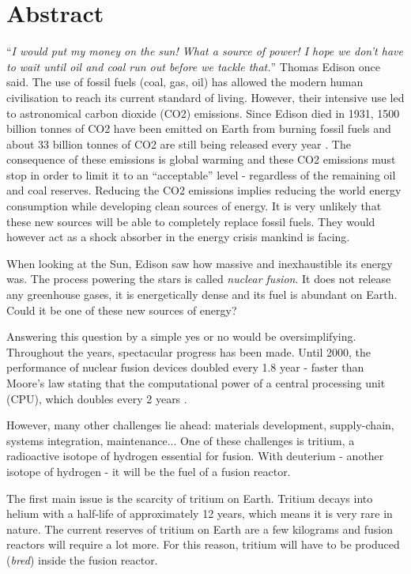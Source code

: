 \chapter*{Abstract}

``\textit{I would put my money on the sun! What a source of power! I hope we don't have to wait until oil and coal run out before we tackle that.}'' Thomas Edison once said.
The use of fossil fuels (coal, gas, oil) has allowed the modern human civilisation to reach its current standard of living.
However, their intensive use led to astronomical carbon dioxide (CO2) emissions.
Since Edison died in 1931, 1500 billion tonnes of CO2 have been emitted on Earth from burning fossil fuels and about 33 billion tonnes of CO2 are still being released every year \cite{friedlingstein_global_2021}.
The consequence of these emissions is global warming and these CO2 emissions must stop in order to limit it to an ``acceptable'' level - regardless of the remaining oil and coal reserves.
Reducing the CO2 emissions implies reducing the world energy consumption while developing clean sources of energy.
It is very unlikely that these new sources will be able to completely replace fossil fuels.
They would however act as a shock absorber in the energy crisis mankind is facing.

When looking at the Sun, Edison saw how massive and inexhaustible its energy was.
The process powering the stars is called \textit{nuclear fusion}.
It does not release any greenhouse gases, it is energetically dense and its fuel is abundant on Earth.
Could it be one of these new sources of energy?

Answering this question by a simple yes or no would be oversimplifying.
Throughout the years, spectacular progress has been made.
Until 2000, the performance of nuclear fusion devices doubled every 1.8 year - faster than Moore's law stating that the computational power of a central processing unit (CPU), which doubles every 2 years \cite{webster_fusion_2003}.

However, many other challenges lie ahead: materials development, supply-chain, systems integration, maintenance...
One of these challenges is tritium, a radioactive isotope of hydrogen essential for fusion.
With deuterium - another isotope of hydrogen - it will be the fuel of a fusion reactor.

The first main issue is the scarcity of tritium on Earth.
Tritium decays into helium with a half-life of approximately 12 years, which means it is very rare in nature.
The current reserves of tritium on Earth are a few kilograms and fusion reactors will require a lot more.
For this reason, tritium will have to be produced (\textit{bred}) inside the fusion reactor.

